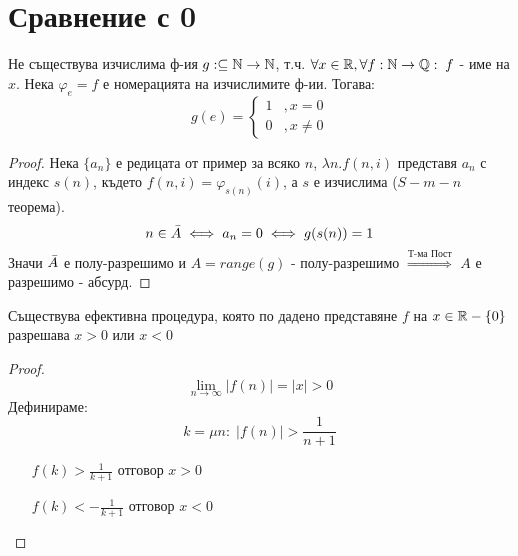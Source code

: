 \section{Сравнение с 0}
\begin{theorem}
    Не съществува изчислима ф-ия $g: \subseteq {\mathbb{N}} \to {\mathbb{N}}$, т.ч. $\forall x \in {\mathbb{R}}, \forall f:{\mathbb{N}} \to {\mathbb{Q}}:\; f$ - име на $x$. Нека $\varphi_e = f$ е номерацията на изчислимите ф-ии. Тогава:
    \begin{equation*}
        g(e) = \begin{cases}
            1 &, x = 0 \\
            0 &, x \neq 0
        \end{cases}
    \end{equation*}
\end{theorem}
\begin{proof}
    Нека $\{a_n\}$ е редицата от пример  за всяко $n$, $\lambda n. f(n, i)$ представя $a_n$ с индекс $s(n)$, където $f(n, i) = \varphi_{s(n)}(i)$, а $s$ е изчислима ($S-m-n$ теорема).
    \begin{equation*}
        n \in \Bar{A} \iff a_n = 0 \iff g(s(n)) = 1
    \end{equation*}
    Значи $\Bar{A}$ е полу-разрешимо и $A = range(g)$ - полу-разрешимо $\overset{\text{Т-ма Пост}}{\Rightarrow}$ $A$ е разрешимо - абсурд.
\end{proof}

\begin{theorem}
    Съществува ефективна процедура, която по дадено представяне $f$ на $x \in {\mathbb{R}} - \{0\}$ разрешава $x > 0$ или $x < 0$
\end{theorem}
\begin{proof}
    \begin{equation*}
        \lim\limits_{n \to \infty} |f(n)| = |x| > 0
    \end{equation*}
    Дефинираме:
    \begin{equation*}
        k = \mu n:\; |f(n)| > \frac{1}{n+1}
    \end{equation*}
    \begin{itemize}
        \item[$f(k) > \frac{1}{k+1}$] отговор $x > 0$
        \item[$f(k) < -\frac{1}{k+1}$] отговор $x < 0$
    \end{itemize}
\end{proof}